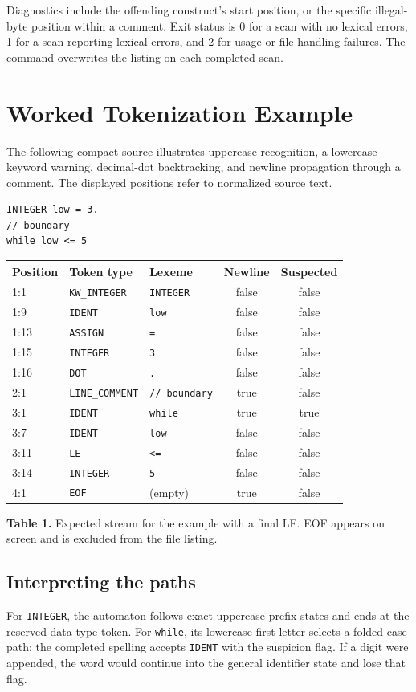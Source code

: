 \documentclass[11pt,a4paper]{article}
\newcommand{\code}[1]{\texttt{#1}}
\begin{document}
Diagnostics include the offending construct's start position, or the specific
illegal-byte position within a comment. Exit status is 0 for a scan with no
lexical errors, 1 for a scan reporting lexical errors, and 2 for usage or file
handling failures. The command overwrites the listing on each completed scan.

\clearpage
\section{Worked Tokenization Example}
The following compact source illustrates uppercase recognition, a lowercase
keyword warning, decimal-dot backtracking, and newline propagation through a
comment. The displayed positions refer to normalized source text.
\begin{lstlisting}
INTEGER low = 3.
// boundary
while low <= 5
\end{lstlisting}

\begin{tabularx}{\linewidth}{@{}l l Y c c@{}}
\toprule Position & Token type & Lexeme & Newline & Suspected \\:1 & \code{KW\_INTEGER} & \code{INTEGER} & false & false \\
1:9 & \code{IDENT} & \code{low} & false & false \\
1:13 & \code{ASSIGN} & \code{=} & false & false \\
1:15 & \code{INTEGER} & \code{3} & false & false \\
1:16 & \code{DOT} & \code{.} & false & false \\
2:1 & \code{LINE\_COMMENT} & \code{// boundary} & true & false \\
3:1 & \code{IDENT} & \code{while} & true & true \\
3:7 & \code{IDENT} & \code{low} & false & false \\
3:11 & \code{LE} & \code{<=} & false & false \\
3:14 & \code{INTEGER} & \code{5} & false & false \\
4:1 & \code{EOF} & (empty) & true & false \\\bottomrule
\end{tabularx}
{\small\textbf{Table 1.} Expected stream for the example with a final LF.
EOF appears on screen and is excluded from the file listing.}

\subsection{Interpreting the paths}
For \code{INTEGER}, the automaton follows exact-uppercase prefix states and
ends at the reserved data-type token. For \code{while}, its lowercase first
letter selects a folded-case path; the completed spelling accepts \code{IDENT}
with the suspicion flag. If a digit were appended, the word would continue
into the general identifier state and lose that flag.
\end{document}
